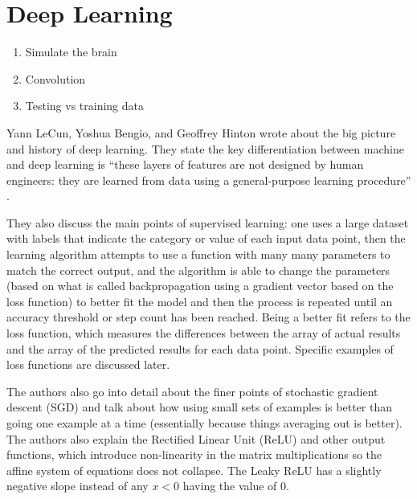 \documentclass[]{report}
\begin{document}
\section{Deep Learning}
\begin{enumerate}
	\item Simulate the brain
	\item Convolution
	\item Testing vs training data
\end{enumerate}


Yann LeCun, Yoshua Bengio, and Geoffrey Hinton wrote about the big picture and history of deep learning. They state the key differentiation between machine and deep learning is “these layers of features are not designed by human engineers: they are learned from data using a general-purpose learning procedure” \cite{ThreeGiants}. 

They also discuss the main points of supervised learning: one uses a large dataset with labels that indicate the category or value of each input data point, then the learning algorithm attempts to use a function with many many parameters to match the correct output, and the algorithm is able to change the parameters (based on what is called backpropagation using a gradient vector based on the loss function) to better fit the model and then the process is repeated until an accuracy threshold or step count has been reached. Being a better fit refers to the loss function, which measures the differences between the array of actual results and the array of the predicted results for each data point. Specific examples of loss functions are discussed later.

The authors also go into detail about the finer points of stochastic gradient descent (SGD) and talk about how using small sets of examples is better than going one example at a time (essentially because things averaging out is better). The authors also explain the Rectified Linear Unit (ReLU) and other output functions, which introduce non-linearity in the matrix multiplications so the affine system of equations does not collapse. The Leaky ReLU has a slightly negative slope instead of any $x < 0$ having the value of $0$.
\end{document}
